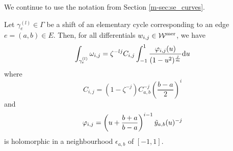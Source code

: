 \documentclass[main.tex]{subfiles}
\begin{document}
  We continue to use the notation from Section \ref{m-sec:se_curves}.

  \begin{thm}\label{thm:periods}
   Let $\gamma_e^{(l)} \in \Gamma$ be a shift of an elementary cycle corresponding
   to an edge $e = (a,b) \in E$. Then, for all differentials $w_{i,j} \in \mathcal{W}^{\text{mer}}$, we have
   \begin{equation}
      \label{eq:thm_periods_1} 
      \int_{\gamma_e^{(l)}} \omega_{i,j}  =  \zeta^{-lj} C_{i,j} \int_{-1}^1 \frac{\varphi_{i,j}(u)}{(1-u^2)^{\frac{j}{m}}}  \mathrm d u
   \end{equation}
   where
   \begin{equation}
    C_{i,j}   =  (1-\zeta^{-j}) C_{a,b}^{-j} \left(\frac{b-a}{2}\right)^i
   \end{equation}
   and 
   \begin{equation}
    \varphi_{i,j}  = \left(u+\frac{b+a}{b-a}\right)^{i-1} \tilde{y}_{a,b}(u)^{-j}
   \end{equation}
   is holomorphic in a neighbourhood $\epsilon_{a,b}$ of $[-1,1]$.
  \end{thm}
\end{document}
